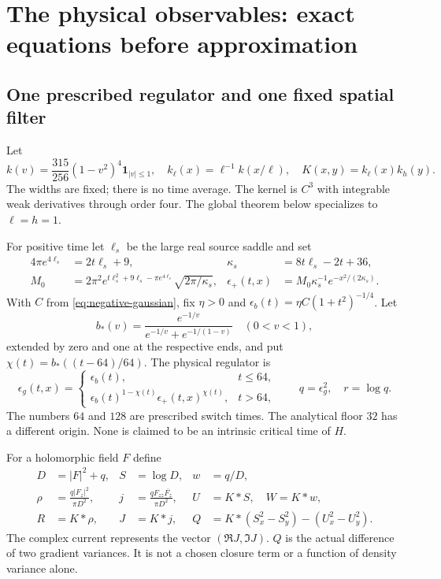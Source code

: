 \section{The physical observables: exact equations before approximation}
\label{sec:physical}

\subsection{One prescribed regulator and one fixed spatial filter}
Let
\begin{equation}
 k(v)=\frac{315}{256}(1-v^2)^4\mathbf1_{|v|\le1},\quad
 k_\ell(x)=\ell^{-1}k(x/\ell),\quad K(x,y)=k_\ell(x)k_h(y).
 \label{eq:kernel}
\end{equation}
The widths are fixed; there is no time average. The kernel is $C^3$
with integrable weak derivatives through order four. The global theorem
below specializes to $\ell=h=1$.

For positive time let $\ell_s$ be the large real source saddle and set
\begin{align}
 4\pi e^{4\ell_s}&=2t\ell_s+9,
 &\kappa_s&=8t\ell_s-2t+36,\\
 M_0&=2\pi^2e^{t\ell_s^2+9\ell_s-\pi e^{4\ell_s}}
                  \sqrt{2\pi/\kappa_s},
 &\epsilon_+(t,x)&=M_0\kappa_s^{-1}e^{-x^2/(2\kappa_s)}.
 \label{eq:source-saddle}
\end{align}
With $C$ from \eqref{eq:negative-gaussian}, fix $\eta>0$ and
$\epsilon_b(t)=\eta C(1+t^2)^{-1/4}$. Let
\[
 b_*(v)=\frac{e^{-1/v}}{e^{-1/v}+e^{-1/(1-v)}}\quad(0<v<1),
\]
extended by zero and one at the respective ends, and put
$\chi(t)=b_*((t-64)/64)$. The physical regulator is
\begin{equation}
 \epsilon_g(t,x)=
 \begin{cases}\epsilon_b(t),&t\le64,\\
 \epsilon_b(t)^{1-\chi(t)}\epsilon_+(t,x)^{\chi(t)},&t>64,
 \end{cases}
 \qquad q=\epsilon_g^2,\quad r=\log q.
 \label{eq:physical-regulator}
\end{equation}
The numbers $64$ and $128$ are prescribed switch times. The analytical
floor $32$ has a different origin. None is claimed to be an intrinsic
critical time of $H$.

For a holomorphic field $F$ define
\begin{align}
 D&=|F|^2+q,& S&=\log D,& w&=q/D,\\
 \rho&=\frac{q|F_z|^2}{\pi D^2},&
 j&=\frac{qF_{zz}\overline{F_z}}{\pi D^2},&
 U&=K*S,\quad W=K*w,\\
 R&=K*\rho,&J&=K*j,&
 Q&=K*(S_x^2-S_y^2)-(U_x^2-U_y^2).
 \label{eq:physical-definitions}
\end{align}
The complex current represents the vector $(\Re J,\Im J)$.
$Q$ is the actual difference of two gradient variances. It is not a
chosen closure term or a function of density variance alone.

